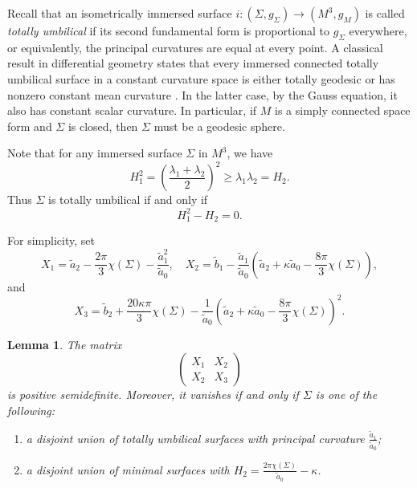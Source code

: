 \documentclass[11pt]{amsart}
\newtheorem{lemma}[theorem]{Lemma}
\theoremstyle{definition}
\numberwithin{equation}{section}
\begin{document}
Recall that an isometrically immersed surface $i:(\Sigma,g_\Sigma)\to(M^3,g_M)$ is called {\em totally umbilical} if its second fundamental form is proportional to $g_\Sigma$ everywhere, or equivalently, the principal curvatures are equal at every point. A classical result in differential geometry states that every immersed connected totally umbilical surface in a constant curvature space is either totally geodesic or has nonzero constant mean curvature \cite[Chapter 7.D]{spivak1970comprehensive}. In the latter case, by the Gauss equation, it also has constant scalar curvature. In particular, if $M$ is a simply connected space form and $\Sigma$ is closed, then $\Sigma$ must be a geodesic sphere.

Note that for any immersed surface $\Sigma$ in $M^3$, we have
\begin{equation}\label{eq: H1^2 ge H2}
    H_1^2 = \left(\frac{\lambda_1 + \lambda_2}{2}\right)^2\ge \lambda_1\lambda_2 = H_2.
\end{equation} 
Thus $\Sigma$ is totally umbilical if and only if 
 \[H_1^2 - H_2 = 0.\]

For simplicity, set
\[X_1 = \tilde a_2 - \frac{2\pi}{3}\chi(\Sigma) - \frac{\tilde a_1^2}{\tilde a_0},\quad X_2 = \tilde b_1 - \frac{\tilde a_1}{\tilde a_0}\left(\tilde a_2 + \kappa\tilde a_0 - \frac{8\pi}{3}\chi(\Sigma)\right),\]
and
\[X_3 = \tilde b_2 + \frac{20\kappa\pi}{3}\chi(\Sigma) - \frac{1}{\tilde a_0}\left(\tilde a_2 + \kappa\tilde a_0 - \frac{8\pi}{3}\chi(\Sigma)\right)^2.\]
\begin{lemma}
    \label{lem: spectrum controls chi} 
    The matrix 
    \begin{equation}
        \label{eq: constraint for chi}
        \begin{pmatrix}
            X_1 & X_2\\
            X_2 & X_3
        \end{pmatrix}
    \end{equation}
    is positive semidefinite. Moreover, it vanishes if and only if  $\Sigma$ is one of the following:
    \begin{enumerate}[(1)]
        \item a disjoint union of totally umbilical surfaces  with principal curvature $\frac{\tilde a_1}{\tilde a_0}$;
        \item a disjoint union of  minimal surfaces with $H_2 = \frac{2\pi\chi(\Sigma)}{\tilde a_0} - \kappa$.
    \end{enumerate}
\end{lemma}
\end{document}
